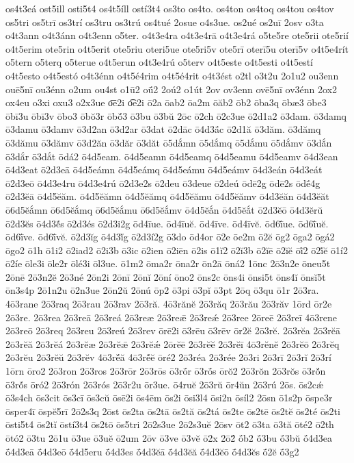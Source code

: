 {os4t3eá
ost5ill
osti5t4
os4t5íll
ostí3t4
os3to
os4to.
os4ton
os4toq
os4tou
os4tov
os5tri
os5trī
os3trí
os3tru
os3trú
os4tué
2osue
o4s3ue.
os2ué
os2uī
2osv
o3ta
o4t3ann
o4t3ánn
o4t3enn
o5ter.
o4t3e4ra
o4t3e4rā
o4t3e4rá
o5te5re
ote5rii
ote5rií
o4t5erim
ote5rin
o4t5erit
ote5riu
oteri5ue
ote5ri5v
ote5rī
oterī5u
oterī5v
o4t5e4rít
o5tern
o5terq
o5terue
o4t5erun
o4t3e4rú
o5terv
o4t5este
o4t5esti
o4t5estí
o4t5esto
o4t5estó
o4t3énn
o4t5é4rim
o4t5é4rit
o4t3ést
o2tl
o3t2u
2o1u2
ou3enn
ouē5nī
ou3énn
o2um
ou4st
o1ū2
oū́2
2oú2
o1út
2ov
ov3enn
ovē5nī
ov3énn
2ox2
ox4eu
o3xi
oxu3
o2x3ue
o͞e2i
o͡e2i
ō2a
ōab2
ōa2m
ōăb2
ōb2
ōba3q
ōbæ3
ōbe3
ōbī3u
ōbī3v
ōbo3
ōbŏ3r
ōbŏ́3
ō3bu
ō3bŭ
2ōc
ō2ch
ō2c3ue
ō2d1a2
ō3dam.
ō3damq
ō3damu
ō3damv
ō3d2an
ō3d2ar
ō3dat
ō2dāc
ō4d3ā́c
ō2d1ă
ō3dăm.
ō3dămq
ō3dămu
ō3dămv
ō3d2ăn
ō3dăr
ō3dăt
ō5dắmn
ō5dắmq
ō5dắmu
ō5dắmv
ō3dắn
ō3dắr
ō3dắt
ōdá2
ō4d5eam.
ō4d5eamn
ō4d5eamq
ō4d5eamu
ō4d5eamv
ō4d3ean
ō4d3eat
ō2d3eā
ō4d5eámn
ō4d5eámq
ō4d5eámu
ō4d5eámv
ō4d3eán
ō4d3eát
ō2d3eō
ō4d3e4ru
ō4d3e4rú
ō2d3e2s
ō2deu
ō3deue
ō2deú
ōdē2g
ōdē2s
ōdḗ4g
ō2d3ĕā
ō4d5ĕăm.
ō4d5ĕămn
ō4d5ĕămq
ō4d5ĕămu
ō4d5ĕămv
ō4d3ĕăn
ō4d3ĕăt
ō6d5ĕắmn
ō6d5ĕắmq
ō6d5ĕắmu
ō6d5ĕắmv
ō4d5ĕắn
ō4d5ĕắt
ō2d3ĕō
ō4d3ĕrŭ
ō2d3ĕs
ō4d3ĕ́s
ō2d3és
ō2d3i2g
ōd4īue.
ōd4īuĕ.
ōd4īve.
ōd4īvĕ.
ōd6ī́ue.
ōd6ī́uĕ.
ōd6ī́ve.
ōd6ī́vĕ.
ō2d3ĭg
ō4d3ĭ́g
ō2d3í2g
ō3do
ōd4or
ō2e
ōe2m
ō2ĕ
ōg2
ōga2
ōgá2
ōgo2
ō1h
ō1i2
ō2iad2
ō2i3b
ō3ic
ō2ien
ō2iēn
ō2is
ō1ĭ2
ō2ĭ3b
ō2ĭē
ō2ĭĕ
ōĭ́2
ō2ĭ́ĕ
ō1í2
ō2íe
ōle3i
ōle2r
ōlé3i
ōl3ue.
ō1m2
ōma2r
ōna2r
ōn2ā
ōná2
1ōnc
2ō3n2e
ōneu5t
2ōnē
2ō3n2ĕ
2ō3né
2ōn2i
2ōnī
2ōnĭ
2ōní
ōno2
ōns2c
ōns4i
ōnsi5t
ōns4ĭ
ōnsĭ5t
ōn3s4p
2ō1n2u
ō2n3ue
2ōn2ŭ
2ōnú
ōp2
ō3pi
ō3pĭ
ō3pt
2ōq
ō3qu
ō1r
2ō3ra.
4ō3rane
2ō3raq
2ō3rau
2ō3rav
2ō3ră.
4ō3rănĕ
2ō3răq
2ō3rău
2ō3răv
1ōrd
ōr2e
2ō3re.
2ō3rea
2ō3reā
2ō3reá
2ō3reæ
2ō3reǣ
2ō3reǽ
2ō3ree
2ōreē
2ō3reī
4ō3rene
2ō3reō
2ō3req
2ō3reu
2ō3reú
2ō3rev
ōrē2i
ō3rēu
ō3rēv
ōr2ĕ
2ō3rĕ.
2ō3rĕa
2ō3rĕā
2ō3rĕă
2ō3rĕá
2ō3rĕæ
2ō3rĕǣ
2ō3rĕǽ
2ōrĕē
2ō3rĕĕ
2ō3rĕī
4ō3rĕnĕ
2ō3rĕō
2ō3rĕq
2ō3rĕu
2ō3rĕŭ
2ō3rĕv
4ō3rĕ́ă
4ō3rĕ́ĕ
ōré2
2ō3réa
2ō3rée
2ō3ri
2ō3rī
2ō3rĭ
2ō3rí
1ōrn
ōro2
2ō3ron
2ō3ros
2ō3rōr
2ō3rōs
ō3rṓr
ō3rṓs
ōrŏ2
2ō3rŏn
2ō3rŏs
ō3rŏ́n
ō3rŏ́s
ōró2
2ō3rón
2ō3rós
2ō3r2u
ōr3ue.
ō4ruĕ
2ō3rŭ
ōr4ŭn
2ō3rú
2ōs.
ōs2cǽ
ō3s4ch
ōs3cit
ōs3cī
ōs3cŭ
ōsē2i
ōs4ēm
ōs2i
ōsi3l4
ōsi2n
ōsíl2
2ōsn
ō1s2p
ōspe3r
ōsper4ī
ōspĕ5rī
2ō2s3q
2ōst
ōs2ta
ōs2tā
ōs2tă
ōs2tá
ōs2te
ōs2tē
ōs2tĕ
ōs2té
ōs2ti
ōsti5t4
ōs2tĭ
ōstí3t4
ōs2tō
ōs5tri
2ō2s3ue
2ō2s3uĕ
2ōsv
ōt2
ō3ta
ō3tă
ōté2
ō2th
ōtó2
ō3tu
2ō1u
ō3ue
ō3uĕ
ō2um
2ōv
ō3ve
ō3vĕ
ō2x
2ō2́
ṓb2
ṓ3bu
ṓ3bŭ
ṓ4d3ea
ṓ4d3eā
ṓ4d3eō
ṓ4d5eru
ṓ4d3es
ṓ4d3ĕā
ṓ4d3ĕă
ṓ4d3ĕō
ṓ4d3ĕs
ṓ2ĕ
ṓ3g2
}
